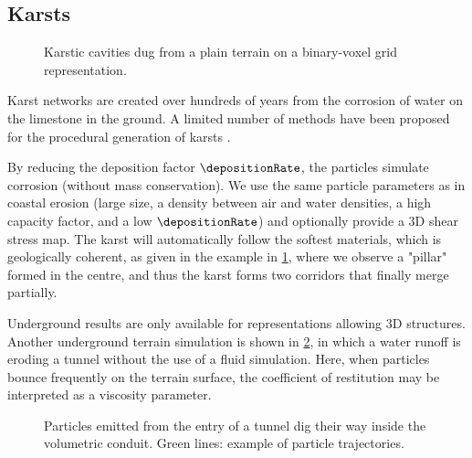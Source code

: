 \subsection{Karsts} 

\begin{figure}[H]
    \caption{Karstic cavities dug from a plain terrain on a binary-voxel grid representation.}
    \label{fig:erosion-results-karst}
\end{figure}

Karst networks are created over hundreds of years from the corrosion of water on the limestone in the ground. A limited number of methods have been proposed for the procedural generation of karsts \cite{Paris2021}.

By reducing the deposition factor $\depositionRate$, the particles simulate corrosion (without mass conservation). We use the same particle parameters as in coastal erosion (large size, a density between air and water densities, a high capacity factor, and a low $\depositionRate$) and optionally provide a 3D shear stress map. The karst will automatically follow the softest materials, which is geologically coherent, as given in the example in \cref{fig:erosion-results-karst}, where we observe a "pillar" formed in the centre, and thus the karst forms two corridors that finally merge partially. %

Underground results are only available for representations allowing 3D structures. Another underground terrain simulation is shown in \cref{fig:erosion-results-tunnel}, in which a water runoff is eroding a tunnel without the use of a fluid simulation. Here, when particles bounce frequently on the terrain surface, the coefficient of restitution may be interpreted as a viscosity parameter. %


\begin{figure}[H]
    \caption{Particles emitted from the entry of a tunnel dig their way inside the volumetric conduit. Green lines: example of particle trajectories. }
    \label{fig:erosion-results-tunnel}
\end{figure}

